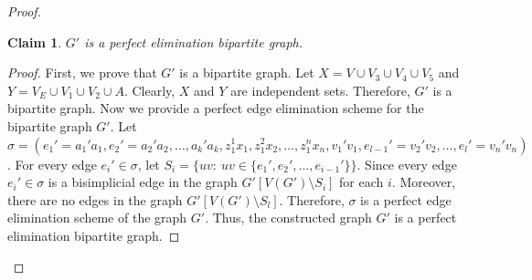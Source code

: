 \documentclass[11pt]{article}
\theoremstyle{plain}
\newtheorem{claim}{Claim}
\begin{document}
\begin{proof}
		\begin{claim} \label{reduction_gen}
			$G'$ is a perfect elimination bipartite graph.
		\end{claim}
		\begin{proof}
			First, we prove that $G'$ is a bipartite graph.
			Let $X = V \cup V_3 \cup V_4 \cup V_5$ and $Y = V_E \cup V_1 \cup V_2 \cup A$. Clearly, $X$ and $Y$ are independent sets. Therefore, $G'$ is a bipartite graph. Now we provide a perfect edge elimination scheme for the bipartite graph $G'$. Let $\sigma = (e_1' = a_1' a_1, e_2' = a_2' a_2, \ldots, a_k' a_k, z^1_1 x_{1}, z^2_1 x_{2}, \ldots, z^n_1 x_{n}, v_1' v_1, e_{l-1}' = v_2' v_2, \ldots, e_l' = v_n' v_n)$. For every edge $e_i'\in \sigma$, let $S_i = \{uv\colon~ uv\in\{e_1', e_2', \ldots, e_{i-1}'\} \}$. 
			Since every edge $e_i'\in \sigma$ is a bisimplicial edge in the graph $G'[V(G') \setminus S_i]$ for each $i$. Moreover, there are no edges in the graph $G'[V(G') \setminus S_l]$. Therefore, $\sigma$ is a perfect edge elimination scheme of the graph $G'$. Thus, the constructed graph $G'$ is a perfect elimination bipartite graph.
		\end{proof}
		

\end{proof}
\end{document}
